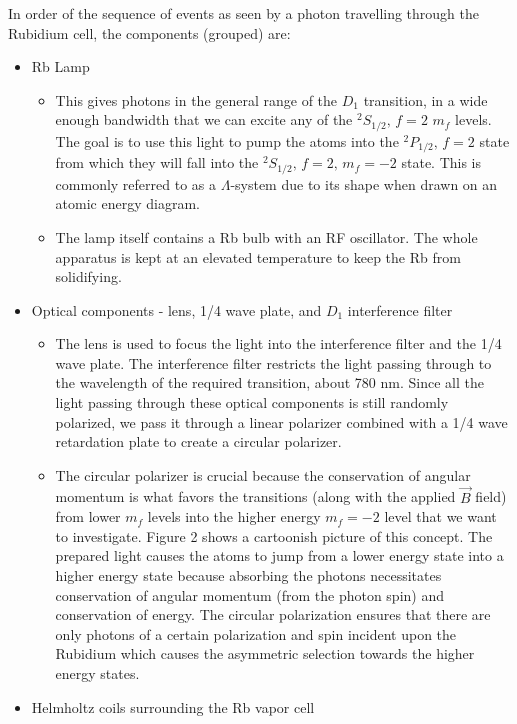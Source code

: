 \documentclass{article}
\newcommand{\twohalfmf}[2]{$^2 #1_{1/2},\, f = 2,\, m_f = #2$}
\newcommand{\twohalf}[1]{$^2 #1_{1/2},\, f = 2$}
\begin{document}
  In order of the sequence of events as seen by a photon travelling through the Rubidium cell, the components (grouped) are:
  \begin{itemize}
    \item Rb Lamp
    \begin{itemize}
      \item This gives photons in the general range of the $D_1$ transition, in a wide enough bandwidth that we can excite any of the \twohalf{S} $m_f$ levels.  The goal is to use this light to pump the atoms into the \twohalf{P} state from which they will fall into the \twohalfmf{S}{-2} state.  This is commonly referred to as a $\Lambda$-system due to its shape when drawn on an atomic energy diagram.
      \item The lamp itself contains a Rb bulb with an RF oscillator.  The whole apparatus is kept at an elevated temperature to keep the Rb from solidifying.
    \end{itemize}
    \item Optical components - lens, 1/4 wave plate, and $D_1$ interference filter
    \begin{itemize}
      \item The lens is used to focus the light into the interference filter and the 1/4 wave plate.  The interference filter restricts the light passing through to the wavelength of the required transition, about 780 nm.  Since all the light passing through these optical components is still randomly polarized, we pass it through a linear polarizer combined with a 1/4 wave retardation plate to create a circular polarizer.
      \item The circular polarizer is crucial because the conservation of angular momentum is what favors the transitions (along with the applied $\vec{B}$ field) from lower $m_f$ levels into the higher energy $m_f = -2$ level that we want to investigate.  Figure 2 shows a cartoonish picture of this concept.  The prepared light causes the atoms to jump from a lower energy state into a higher energy state because absorbing the photons necessitates conservation of angular momentum (from the photon spin) and conservation of energy.  The circular polarization ensures that there are only photons of a certain polarization and spin incident upon the Rubidium which causes the asymmetric selection towards the higher energy states.
    \end{itemize}
    \item Helmholtz coils surrounding the Rb vapor cell
    \begin{itemize}

\end{itemize}
\end{itemize}
\end{document}
